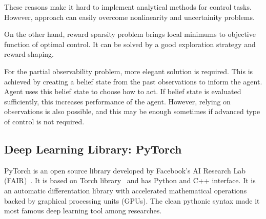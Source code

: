 These reasons make it hard to implement analytical methods for control tasks. 
However, approach can easily overcome nonlinearity and uncertainity problems.

On the other hand, reward sparsity problem brings local minimums to objective function of optimal control. It can be solved by a good exploration strategy and reward shaping. 

For the partial observability problem, more elegant solution is required. 
This is achieved by creating a belief state from the past observations to inform the agent. 
Agent uses this belief state to choose how to act. 
If belief state is evaluated sufficiently, 
this increases performance of the agent.
However, relying on observations is also possible, 
and this may be enough sometimes if advanced type of control is not required. 

\subsection{Deep Learning Library: PyTorch}
\label{dl_pytorch}
PyTorch is an open source library developed by Facebook's AI Research Lab (FAIR)~\cite{paszke_pytorch_2019}. 
It is based on Torch library~\cite{collobert_torch7_2011} and has Python and C++ interface. 
It is an automatic differentation library with accelerated mathematical operations backed by graphical processing units (GPUs). 
The clean pythonic syntax made it most famous deep learning tool among researches. 
